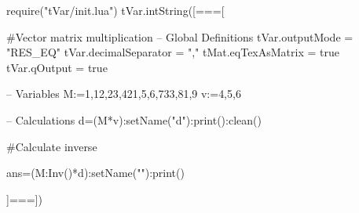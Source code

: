 \documentclass{article}
\begin{document}
\begin{luacode}
require("tVar/init.lua")
tVar.intString([===[

#Vector matrix multiplication
-- Global Definitions
tVar.outputMode = "RES_EQ"
tVar.decimalSeparator = ","
tMat.eqTexAsMatrix = true
tVar.qOutput = true

-- Variables
M:={{1,12,23},{421,5,6},{733,81,9}}
v:={4,5,6}

-- Calculations
d=(M*v):setName("d"):print():clean()

#Calculate inverse

ans=(M:Inv()*d):setName(""):print()

]===])	
\end{luacode}
\end{document}
